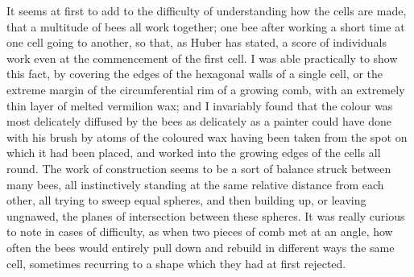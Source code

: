 \indent It seems at first to add to the difficulty of understanding how the cells are made, that a multitude of bees all work together; one bee after working a short time at one cell going to another, so that, as Huber has stated, a score of individuals work even at the commencement of the first cell. I was able practically to show this fact, by covering the edges of the hexagonal walls of a single cell, or the extreme margin of the circumferential rim of a growing comb, with an extremely thin layer of melted vermilion wax; and I invariably found that the colour was most delicately diffused by the bees as delicately as a painter could have done with his brush by atoms of the coloured wax having been taken from the spot on which it had been placed, and worked into the growing edges of the cells all round. The work of construction seems to be a sort of balance struck between many bees, all instinctively standing at the same relative distance from each other, all trying to sweep equal spheres, and then building up, or leaving ungnawed, the planes of intersection between these spheres. It was really curious to note in cases of difficulty, as when two pieces of comb met at an angle, how often the bees would entirely pull down and rebuild in different ways the same cell, sometimes recurring to a shape which they had at first rejected.\\

